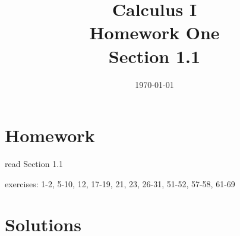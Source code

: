 \documentclass[letterpaper, landscape]{exam}
\title{Calculus I \\ Homework One \\ Section 1.1}
\author{}
\date{\today}
\begin{document}
  \maketitle

  \section{Homework}
    \begin{itemize*}
      \item read Section 1.1
      \item exercises: 1-2, 5-10, 12, 17-19, 21, 23, 26-31, 51-52, 57-58, 61-69
    \end{itemize*}

  \ifprintanswers
    \section{Solutions}
\end{document}

